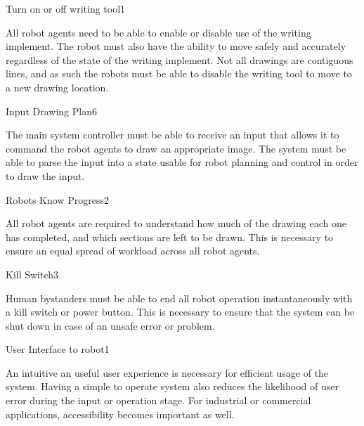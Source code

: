 \begin{functional_requirement}{Turn on or off writing tool}{1}
\item All robot agents need to be able to enable or disable use of the writing implement. The robot must also have the ability to move safely and accurately regardless of the state of the writing implement. Not all drawings are contiguous lines, and as such the robots must be able to disable the writing tool to move to a new drawing location. 
\end{functional_requirement}

\begin{functional_requirement}{Input Drawing Plan}{6}
\item The main system controller must be able to receive an input that allows it to command the robot agents to draw an appropriate image. The system must be able to parse the input into a state usable for robot planning and control in order to draw the input. 
\end{functional_requirement}

\begin{functional_requirement}{Robots Know Progress}{2}
\item All robot agents are required to understand how much of the drawing each one has completed, and which sections are left to be drawn. This is necessary to ensure an equal spread of workload across all robot agents.
\end{functional_requirement}

\begin{functional_requirement}{Kill Switch}{3}
\item Human bystanders must be able to end all robot operation instantaneously with a kill switch or power button. This is necessary to ensure that the system can be shut down in case of an unsafe error or problem.
\end{functional_requirement}

\begin{functional_requirement}{User Interface to robot}{1}
\item An intuitive an useful user experience is necessary for efficient usage of the system. Having a simple to operate system also reduces the likelihood of user error during the input or operation stage. For industrial or commercial applications, accessibility becomes important as well. 
\end{functional_requirement}

